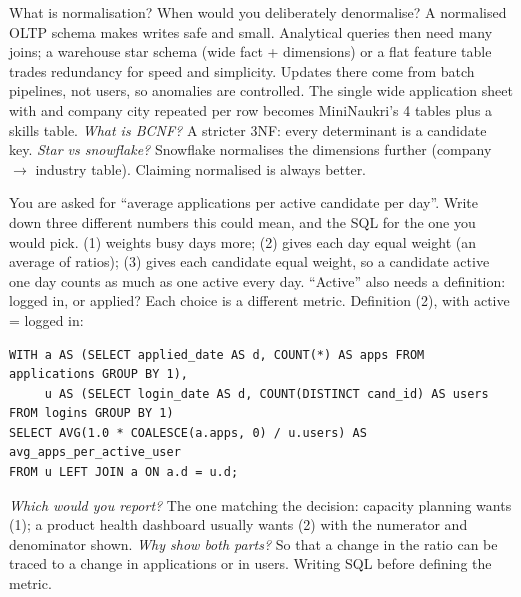 \begin{qa}{What is normalisation? When would you deliberately denormalise?}
\why A normalised OLTP schema makes writes safe and small. Analytical queries then need many joins; a warehouse star schema (wide fact + dimensions) or a
flat feature table trades redundancy for speed and simplicity. Updates there come from batch pipelines, not users, so anomalies are controlled.
\worked The single wide application sheet with  and company city repeated per row becomes MiniNaukri's 4 tables plus a
skills table.
\pushes \emph{What is BCNF?} A stricter 3NF: every determinant is a candidate key. \emph{Star vs snowflake?} Snowflake normalises the dimensions further
(company $\to$ industry table).
\pitfall Claiming normalised is always better.
\end{qa}

\begin{qa}{\deep You are asked for ``average applications per active candidate per day''. Write down three different numbers this could mean, and the SQL
for the one you would pick.}
\why (1) weights busy days more; (2) gives each day equal weight (an average of ratios); (3) gives each candidate equal weight, so a candidate active one
day counts as much as one active every day. ``Active'' also needs a definition: logged in, or applied? Each choice is a different metric.
\worked Definition (2), with active = logged in:
\begin{lstlisting}[style=sql]
WITH a AS (SELECT applied_date AS d, COUNT(*) AS apps FROM applications GROUP BY 1),
     u AS (SELECT login_date AS d, COUNT(DISTINCT cand_id) AS users FROM logins GROUP BY 1)
SELECT AVG(1.0 * COALESCE(a.apps, 0) / u.users) AS avg_apps_per_active_user
FROM u LEFT JOIN a ON a.d = u.d;
\end{lstlisting}
\pushes \emph{Which would you report?} The one matching the decision: capacity planning wants (1); a product health dashboard usually wants (2) with
the numerator and denominator shown. \emph{Why show both parts?} So that a change in the ratio can be traced to a change in applications or in users.
\pitfall Writing SQL before defining the metric.
\end{qa}

